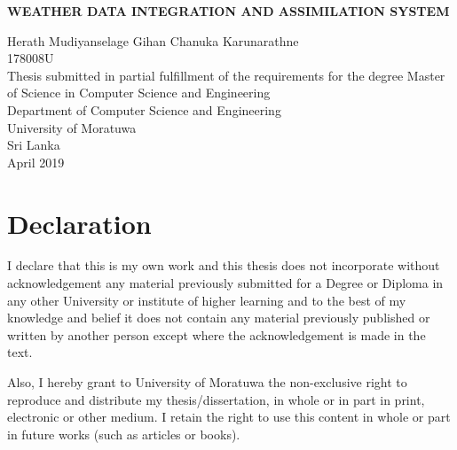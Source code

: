 \documentclass[a4paper,oneside,12pt]{report}
\begin{document}
\begin{titlepage}
    \begin{center}
        \Large{
        \textbf{WEATHER DATA INTEGRATION AND ASSIMILATION SYSTEM}}\\
        \vspace{144pt}
  \large      

        Herath Mudiyanselage Gihan Chanuka Karunarathne\\
        \vspace{24pt}
        178008U\\
         \vspace{72pt}
        \normalsize
        Thesis submitted in partial fulfillment of the requirements for the degree Master of Science in Computer Science and Engineering\\
     
       \vspace{72pt}
        \large
        Department of Computer Science and Engineering\\
        \vspace{24pt}
        University of Moratuwa\\
        Sri Lanka\\
        \vspace{32pt}
        April 2019
        
    \end{center}
\end{titlepage}


\chapter*{Declaration}

I declare that this is my own work and this thesis does not
incorporate without acknowledgement any material previously submitted for a
Degree or Diploma in any other University or institute of higher learning and to
the best of my knowledge and belief it does not contain any material previously
published or written by another person except where the acknowledgement is
made in the text.

Also, I hereby grant to University of Moratuwa the non-exclusive right to
reproduce and distribute my thesis/dissertation, in whole or in part in print,
electronic or other medium. I retain the right to use this content in whole or part
in future works (such as articles or books).
\end{document}

